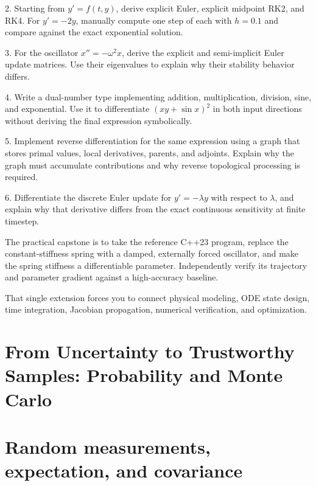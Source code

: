2. Starting from \(y'=f(t,y)\), derive explicit Euler, explicit midpoint RK2, and RK4. For \(y'=-2y\), manually compute one step of each with \(h=0.1\) and compare against the exact exponential solution.

3. For the oscillator \(x''=-\omega^2x\), derive the explicit and semi-implicit Euler update matrices. Use their eigenvalues to explain why their stability behavior differs.

4. Write a dual-number type implementing addition, multiplication, division, sine, and exponential. Use it to differentiate \((xy+\sin x)^2\) in both input directions without deriving the final expression symbolically.

5. Implement reverse differentiation for the same expression using a graph that stores primal values, local derivatives, parents, and adjoints. Explain why the graph must accumulate contributions and why reverse topological processing is required.

6. Differentiate the discrete Euler update for \(y'=-\lambda y\) with respect to \(\lambda\), and explain why that derivative differs from the exact continuous sensitivity at finite timestep.

The practical capstone is to take the reference C++23 program, replace the constant-stiffness spring with a damped, externally forced oscillator, and make the spring stiffness a differentiable parameter. Independently verify its trajectory and parameter gradient against a high-accuracy baseline.

That single extension forces you to connect physical modeling, ODE state design, time integration, Jacobian propagation, numerical verification, and optimization.

\section{From Uncertainty to Trustworthy Samples: Probability and Monte Carlo}\label{02-foundations-ii-ch022-from-uncertainty-to-trustworthy-samples-probability-and-monte-carlo}

\hypertarget{02-foundations-ii-ch022-from-uncertainty-to-trustworthy-samples-probability-and-monte-carlo}{}

\section{Random measurements, expectation, and covariance}\label{02-foundations-ii-ch022-random-measurements-expectation-and-covariance}

